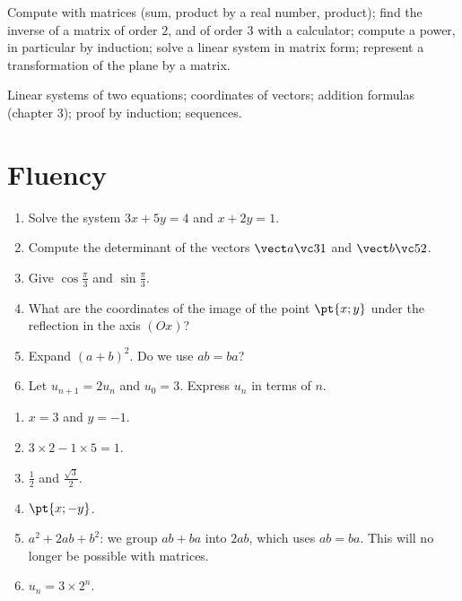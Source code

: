 
\begin{objectives}
Compute with matrices (sum, product by a real number, product); find the inverse of a matrix of order $2$, and of order $3$ with a calculator; compute a power, in particular by induction; solve a linear system in matrix form; represent a transformation of the plane by a matrix.
\end{objectives}
\begin{prerequisites}
Linear systems of two equations; coordinates of vectors; addition formulas (chapter 3); proof by induction; sequences.
\end{prerequisites}

\section{Fluency}
\begin{fluency}
\begin{enumerate}
\item Solve the system $3x+5y=4$ and $x+2y=1$.
\item Compute the determinant of the vectors $\vect a\vc31$ and $\vect b\vc52$.
\item Give $\cos\frac\pi3$ and $\sin\frac\pi3$.
\item What are the coordinates of the image of the point $\pt{x;y}$ under the reflection in the axis $(Ox)$?
\item Expand $(a+b)^2$. Do we use $ab=ba$?
\item Let $u_{n+1}=2u_n$ and $u_0=3$. Express $u_n$ in terms of $n$.
\end{enumerate}
\end{fluency}
\begin{solution}[Fluency]
\begin{enumerate}
\item $x=3$ and $y=-1$.
\item $3\times2-1\times5=1$.
\item $\frac12$ and $\frac{\sqrt3}2$.
\item $\pt{x;-y}$.
\item $a^2+2ab+b^2$: we group $ab+ba$ into $2ab$, which uses $ab=ba$. This will no longer be possible with matrices.
\item $u_n=3\times2^n$.
\end{enumerate}
\end{solution}

